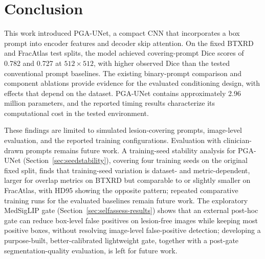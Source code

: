\section{Conclusion}
This work introduced PGA-UNet, a compact CNN that incorporates a box prompt into encoder features and decoder skip attention. On the fixed BTXRD and FracAtlas test splits, the model achieved covering-prompt Dice scores of 0.782 and 0.727 at $512\times512$, with higher observed Dice than the tested conventional prompt baselines. The existing binary-prompt comparison and component ablations provide evidence for the evaluated conditioning design, with effects that depend on the dataset. PGA-UNet contains approximately 2.96 million parameters, and the reported timing results characterize its computational cost in the tested environment.

These findings are limited to simulated lesion-covering prompts, image-level evaluation, and the reported training configurations. Evaluation with clinician-drawn prompts remains future work. A training-seed stability analysis for PGA-UNet (Section~\ref{sec:seedstability}), covering four training seeds on the original fixed split, finds that training-seed variation is dataset- and metric-dependent, larger for overlap metrics on BTXRD but comparable to or slightly smaller on FracAtlas, with HD95 showing the opposite pattern; repeated comparative training runs for the evaluated baselines remain future work. The exploratory MedSigLIP gate (Section~\ref{sec:selfassess-results}) shows that an external post-hoc gate can reduce box-level false positives on lesion-free images while keeping most positive boxes, without resolving image-level false-positive detection; developing a purpose-built, better-calibrated lightweight gate, together with a post-gate segmentation-quality evaluation, is left for future work.
